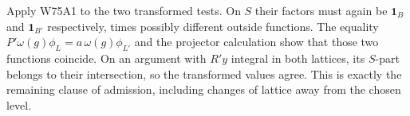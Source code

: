Apply W75A1 to the two transformed tests. On $S$ their factors
must again be $\mathbf1_B$ and $\mathbf1_{B'}$ respectively,
times possibly different outside functions. The equality
$P'\omega(g)\phi_L=a\,\omega(g)\phi_{L'}$ and the projector
calculation show that those two functions coincide. On an argument
with $R'y$ integral in both lattices, its $S$-part belongs to their
intersection, so the transformed values agree. This is exactly
the remaining clause of admission, including changes of lattice
away from the chosen level.
